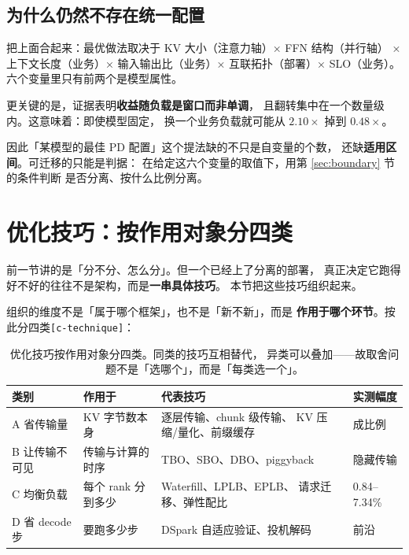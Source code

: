 \subsection{为什么仍然不存在统一配置}

把上面合起来：最优做法取决于 KV 大小（注意力轴）× FFN 结构（并行轴）
× 上下文长度（业务）× 输入输出比（业务）× 互联拓扑（部署）×
SLO（业务）。六个变量里只有前两个是模型属性。

更关键的是，证据表明\textbf{收益随负载是窗口而非单调}，
且翻转集中在一个数量级内。这意味着：即使模型固定，
换一个业务负载就可能从 $2.10\times$ 掉到 $0.48\times$。

因此「某模型的最佳 PD 配置」这个提法缺的不只是自变量的个数，
还缺\textbf{适用区间}。可迁移的只能是判据：
在给定这六个变量的取值下，用第 \ref{sec:boundary} 节的条件判断
是否分离、按什么比例分离。

\section{优化技巧：按作用对象分四类}
\label{sec:technique}

前一节讲的是「分不分、怎么分」。但一个已经上了分离的部署，
真正决定它跑得好不好的往往不是架构，而是\textbf{一串具体技巧}。
本节把这些技巧组织起来。

组织的维度不是「属于哪个框架」，也不是「新不新」，而是
\textbf{作用于哪个环节}。按此分四类\texttt{[c-technique]}：

\begin{table}[t]
\centering
\caption{优化技巧按作用对象分四类。同类的技巧互相替代，
异类可以叠加——故取舍问题不是「选哪个」，而是「每类选一个」。}
\label{tab:technique}
\small
\setlength{\tabcolsep}{5pt}
\begin{tabular}{@{}p{1.12cm}p{1.19cm}p{1.89cm}p{2.8cm}@{}}
\toprule
类别 & 作用于 & 代表技巧 & 实测幅度 \\
\midrule
A 省传输量 & KV 字节数本身 & 逐层传输、chunk 级传输、
  KV 压缩/量化、前缀缓存 & 成比例 \\
B 让传输不可见 & 传输与计算的时序 & TBO、SBO、DBO、piggyback
  & 隐藏传输 \\
C 均衡负载 & 每个 rank 分到多少 & Waterfill、LPLB、EPLB、
  请求迁移、弹性配比 & 0.84--7.34\% \\
D 省 decode 步 & 要跑多少步 & DSpark 自适应验证、投机解码
  & 前沿 \\
\bottomrule
\end{tabular}
\end{table}

